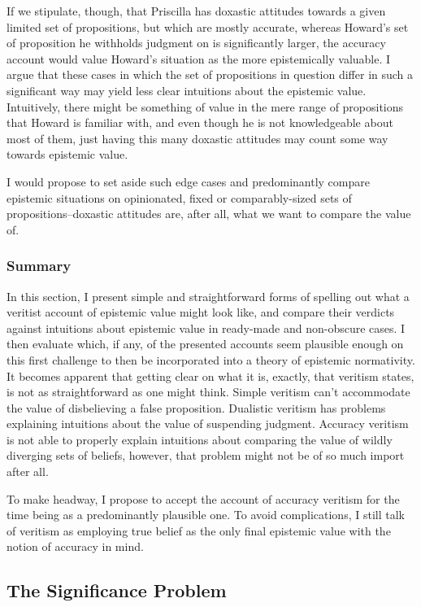 \documentclass[12pt,numbers=noenddot]{scrartcl}
\begin{document}
If we stipulate, though, that Priscilla has doxastic attitudes towards a given limited set of propositions, but which are mostly accurate, whereas Howard's set of proposition he withholds judgment on is significantly larger, the accuracy account would value Howard's situation as the more epistemically valuable. I argue that these cases in which the set of propositions in question differ in such a significant way may yield less clear intuitions about the epistemic value. Intuitively, there might be something of value in the mere range of propositions that Howard is familiar with, and even though he is not knowledgeable about most of them, just having this many doxastic attitudes may count some way towards epistemic value.

I would propose to set aside such edge cases and predominantly compare epistemic situations on opinionated, fixed or comparably-sized sets of propositions–doxastic attitudes are, after all, what we want to compare the value of.

\subsubsection{Summary}

In this section, I present simple and straightforward forms of spelling out what a veritist account of epistemic value might look like, and compare their verdicts against intuitions about epistemic value in ready-made and non-obscure cases. I then evaluate which, if any, of the presented accounts seem plausible enough on this first challenge to then be incorporated into a theory of epistemic normativity. It becomes apparent that getting clear on what it is, exactly, that veritism states, is not as straightforward as one might think. Simple veritism can't accommodate the value of disbelieving a false proposition. Dualistic veritism has problems explaining intuitions about the value of suspending judgment. Accuracy veritism is not able to properly explain intuitions about comparing the value of wildly diverging sets of beliefs, however, that problem might not be of so much import after all.

To make headway, I propose to accept the account of accuracy veritism for the time being as a predominantly plausible one. To avoid complications, I still talk of veritism as employing true belief as the only final epistemic value with the notion of accuracy in mind.


\subsection{The Significance Problem}
\end{document}
